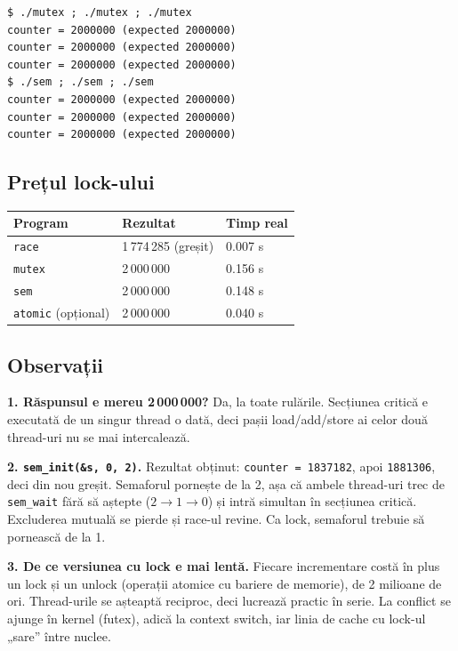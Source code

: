 \documentclass[11pt,a4paper]{article}
\begin{document}
\begin{terminal}
\begin{verbatim}
$ ./mutex ; ./mutex ; ./mutex
counter = 2000000 (expected 2000000)
counter = 2000000 (expected 2000000)
counter = 2000000 (expected 2000000)
$ ./sem ; ./sem ; ./sem
counter = 2000000 (expected 2000000)
counter = 2000000 (expected 2000000)
counter = 2000000 (expected 2000000)
\end{verbatim}
\end{terminal}

\subsection{Prețul lock-ului}
\begin{center}
\begin{tabular}{lll}
\toprule
Program & Rezultat & Timp real \\
\midrule
\texttt{race}   & 1\,774\,285 (greșit) & 0.007 s \\
\texttt{mutex}  & 2\,000\,000 & 0.156 s \\
\texttt{sem}    & 2\,000\,000 & 0.148 s \\
\texttt{atomic} (opțional) & 2\,000\,000 & 0.040 s \\
\bottomrule
\end{tabular}
\end{center}

\subsection*{Observații}
\begin{answer}
\textbf{1. Răspunsul e mereu 2\,000\,000?} Da, la toate rulările. Secțiunea critică e executată de un singur thread o
dată, deci pașii load/add/store ai celor două thread-uri nu se mai intercalează.

\medskip
\textbf{2. \texttt{sem\_init(\&s, 0, 2)}.} Rezultat obținut: \texttt{counter = 1837182}, apoi \texttt{1881306}, deci din
nou greșit. Semaforul pornește de la 2, așa că ambele thread-uri trec de \texttt{sem\_wait} fără să aștepte
($2\to1\to0$) și intră simultan în secțiunea critică. Excluderea mutuală se pierde și race-ul revine. Ca lock, semaforul
trebuie să pornească de la 1.

\medskip
\textbf{3. De ce versiunea cu lock e mai lentă.} Fiecare incrementare costă în plus un lock și un unlock (operații
atomice cu bariere de memorie), de 2 milioane de ori. Thread-urile se așteaptă reciproc, deci lucrează practic în serie.
La conflict se ajunge în kernel (futex), adică la context switch, iar linia de cache cu lock-ul „sare” între nuclee.
\end{answer}
\end{document}
